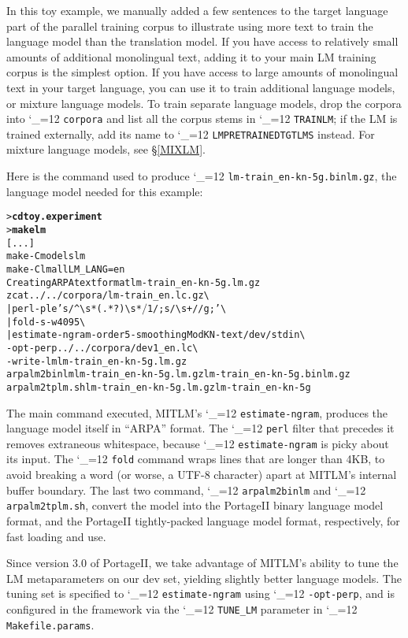 \documentclass[11pt,letterpaper]{article}
\newcommand{\bs}{\textbackslash{}}
\newcommand{\PS}{PortageII\xspace}
\def\code{\begingroup\catcode`\_=12 \codex}
\newcommand{\codex}[1]{\texttt{#1}\endgroup}
\begin{document}
In this toy example, we manually added a few sentences to the target language
part of the parallel training corpus to illustrate using more text to train the
language model than the translation model.  If you have access to relatively
small amounts of additional monolingual text, adding it to your main LM
training corpus is the simplest option.  If you have access to large amounts of
monolingual text in your target language, you can use it to train additional
language models, or mixture language models.  To train separate language
models, drop the corpora into \code{corpora} and list all the corpus stems in
\code{TRAIN\us{}LM}; if the LM is trained externally, add its name to
\code{LM\us{}PRETRAINED\us{}TGT\us{}LMS} instead.  For mixture language models,
see \S\ref{MIXLM}.

Here is the command used to produce
\code{lm-train_en-kn-5g.binlm.gz},
the language model needed for this example:
\begin{small}
\begin{alltt}
   > \textbf{cd toy.experiment}
   > \textbf{make lm}
   [...]
   make -C models lm
   make -C lm all LM_LANG=en
   Creating ARPA text format lm-train_en-kn-5g.lm.gz
   zcat ../../corpora/lm-train_en.lc.gz \bs
      | perl -ple 's/^{\bs}s*(.*?){\bs}s*$/$1/; s/{\bs}s+/ /g;' \bs
      | fold -s -w 4095 \bs
      | estimate-ngram -order 5 -smoothing ModKN -text /dev/stdin \bs
        -opt-perp ../../corpora/dev1_en.lc \bs
        -write-lm lm-train_en-kn-5g.lm.gz
   arpalm2binlm lm-train_en-kn-5g.lm.gz lm-train_en-kn-5g.binlm.gz
   arpalm2tplm.sh lm-train_en-kn-5g.lm.gz lm-train_en-kn-5g
\end{alltt}
\end{small}
The main command executed, MITLM's \code{estimate-ngram}, produces the language
model itself in ``ARPA'' format.  The \code{perl} filter that precedes it
removes extraneous whitespace, because \code{estimate-ngram} is picky about its
input.  The \code{fold} command wraps lines that are longer than 4KB, to avoid
breaking a word (or worse, a UTF-8 character) apart at MITLM's internal buffer
boundary.  The last two command, \code{arpalm2binlm} and \code{arpalm2tplm.sh},
convert the model into the \PS binary language model format, and the \PS
tightly-packed language model format, respectively, for fast loading and use.

Since version 3.0 of \PS, we take advantage of MITLM's ability to tune the LM
metaparameters on our dev set, yielding slightly better language models.  The
tuning set is specified to \code{estimate-ngram} using \code{-opt-perp}, and is
configured in the framework via the \code{TUNE_LM} parameter in
\code{Makefile.params}.
\end{document}
